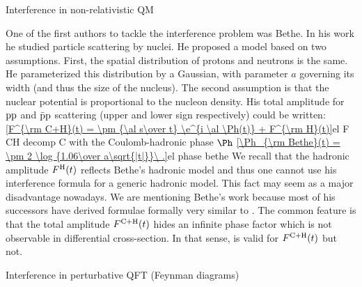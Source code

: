 \caption{Interference in non-relativistic QM}

One of the first authors to tackle the interference problem was Bethe. In his work  he studied particle scattering by nuclei. He proposed a model based on two assumptions. First, the spatial distribution of protons and neutrons is the same. He parameterized this distribution by a Gaussian, with parameter $a$ governing its width (and thus the size of the nucleus). The second assumption is that the nuclear potential is proportional to the nucleon density. His total amplitude for $\rm pp$ and $\rm \bar pp$ scattering (upper and lower sign respectively) could be written:
\eqref{F^{\rm C+H}(t) = \pm {\al s\over t} \e^{i \al \Ph(t)} + F^{\rm H}(t)}{el F CH decomp C}
with the Coulomb-hadronic phase $\Ph$
\eqref{\Ph_{\rm Bethe}(t) = \pm 2 \log {1.06\over a\sqrt{|t|}}\ .}{el phase bethe}
We recall that the hadronic amplitude $F^{\rm H}(t)$ reflects Bethe's hadronic model and thus one cannot use his interference formula for a generic hadronic model. This fact may seem as a major disadvantage nowadays. We are mentioning Bethe's work because most of his successors have derived formulae formally very similar to . The common feature is that the total amplitude $F^{\rm C+H}(t)$ hides an infinite phase factor which is not observable in differential cross-section. In that sense,  is valid for $F^{\rm C+H}(t)$ but  not.

\caption{Interference in perturbative QFT (Feynman diagrams)}



